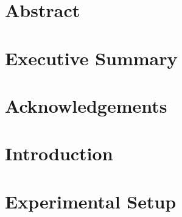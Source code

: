 \documentclass[12pt, oneside]{book}
\begin{document}

\chapter{Abstract}

\chapter{Executive Summary}


\chapter{Acknowledgements}


\tableofcontents

\listoffigures

\mainmatter

\chapter{Introduction}


\chapter{Experimental Setup}

\end{document}

